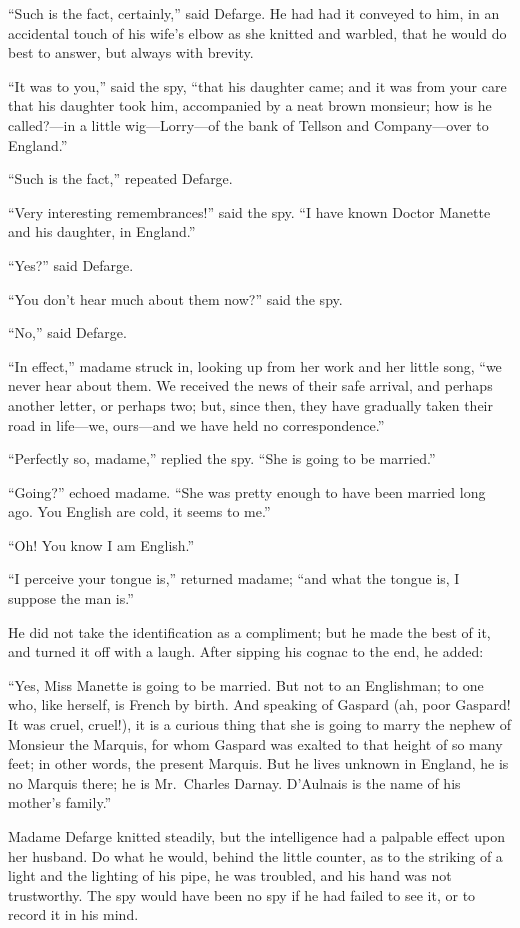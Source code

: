 ``Such is the fact, certainly,'' said Defarge.  He had had it conveyed
to him, in an accidental touch of his wife's elbow as she knitted and
warbled, that he would do best to answer, but always with brevity.

``It was to you,'' said the spy, ``that his daughter came; and it was
from your care that his daughter took him, accompanied by a neat brown
monsieur; how is he called?---in a little wig---Lorry---of the bank of
Tellson and Company---over to England.''

``Such is the fact,'' repeated Defarge.

``Very interesting remembrances!'' said the spy.  ``I have known Doctor
Manette and his daughter, in England.''

``Yes?'' said Defarge.

``You don't hear much about them now?'' said the spy.

``No,'' said Defarge.

``In effect,'' madame struck in, looking up from her work and her little
song, ``we never hear about them.  We received the news of their safe
arrival, and perhaps another letter, or perhaps two; but, since then,
they have gradually taken their road in life---we, ours---and we have
held no correspondence.''

``Perfectly so, madame,'' replied the spy.  ``She is going to be married.''

``Going?'' echoed madame.  ``She was pretty enough to have been married
long ago.  You English are cold, it seems to me.''

``Oh!  You know I am English.''

``I perceive your tongue is,'' returned madame; ``and what the tongue is,
I suppose the man is.''

He did not take the identification as a compliment; but he made the
best of it, and turned it off with a laugh.  After sipping his
cognac to the end, he added:

``Yes, Miss Manette is going to be married.  But not to an Englishman;
to one who, like herself, is French by birth.  And speaking of Gaspard
(ah, poor Gaspard!  It was cruel, cruel!), it is a curious thing that
she is going to marry the nephew of Monsieur the Marquis, for whom
Gaspard was exalted to that height of so many feet; in other words,
the present Marquis.  But he lives unknown in England, he is no
Marquis there; he is Mr.\ Charles Darnay.  D'Aulnais is the name
of his mother's family.''

Madame Defarge knitted steadily, but the intelligence had a palpable
effect upon her husband.  Do what he would, behind the little counter,
as to the striking of a light and the lighting of his pipe, he was
troubled, and his hand was not trustworthy.  The spy would have been
no spy if he had failed to see it, or to record it in his mind.

